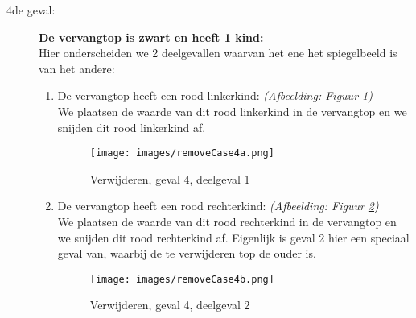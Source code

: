 \documentclass[11pt,a4paper]{report}
\begin{document}
\begin{description}
\item[4de geval:]
\textbf{De vervangtop is zwart en heeft 1 kind:}\\
Hier onderscheiden we 2 deelgevallen waarvan het ene het spiegelbeeld is van het andere:
\begin{enumerate}
\item De vervangtop heeft een rood linkerkind: \textsl{(Afbeelding: Figuur \ref{removeCase4a})}\\
We plaatsen de waarde van dit rood linkerkind in de vervangtop en we snijden dit rood linkerkind af.
\begin{figure}[h!]
	\centering
		\texttt{[image: images/removeCase4a.png]}
	\caption{Verwijderen, geval 4, deelgeval 1}
	\label{removeCase4a}
\end{figure}
\item De vervangtop heeft een rood rechterkind: \textsl{(Afbeelding: Figuur \ref{removeCase4b})}\\
We plaatsen de waarde van dit rood rechterkind in de vervangtop en we snijden dit rood rechterkind af. Eigenlijk is geval 2 hier een speciaal geval van, waarbij de te verwijderen top de ouder is.
\begin{figure}[h!]
	\centering
		\texttt{[image: images/removeCase4b.png]}
	\caption{Verwijderen, geval 4, deelgeval 2}
	\label{removeCase4b}
\end{figure}
\end{enumerate}


\end{description}
\end{document}
